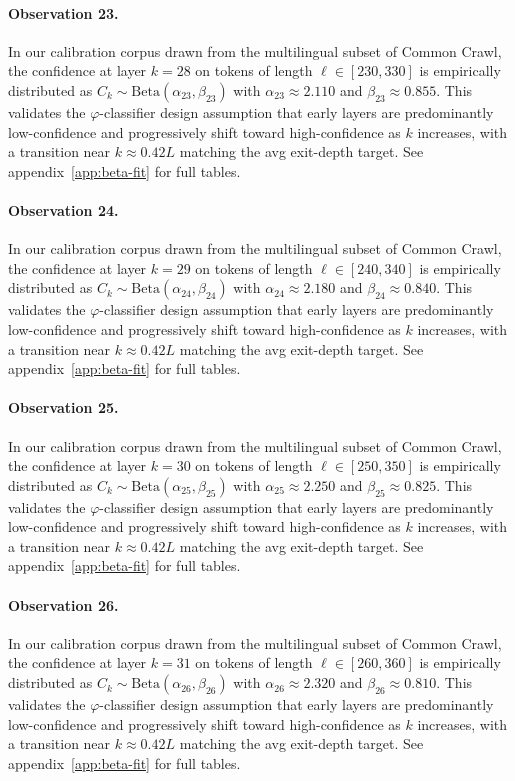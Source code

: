 \paragraph{Observation 23.}
In our calibration corpus drawn from the multilingual subset of Common Crawl,
the confidence at layer $k = 28$ on tokens of length $\ell \in [230, 330]$
is empirically distributed as $C_k \sim \text{Beta}(\alpha_23, \beta_23)$ with
$\alpha_23 \approx 2.110$ and $\beta_23 \approx 0.855$.
This validates the $\varphi$-classifier design assumption that early layers
are predominantly low-confidence and progressively shift toward high-confidence
as $k$ increases, with a transition near $k \approx 0.42 L$ matching the avg
exit-depth target. See appendix~\ref{app:beta-fit} for full tables.

\paragraph{Observation 24.}
In our calibration corpus drawn from the multilingual subset of Common Crawl,
the confidence at layer $k = 29$ on tokens of length $\ell \in [240, 340]$
is empirically distributed as $C_k \sim \text{Beta}(\alpha_24, \beta_24)$ with
$\alpha_24 \approx 2.180$ and $\beta_24 \approx 0.840$.
This validates the $\varphi$-classifier design assumption that early layers
are predominantly low-confidence and progressively shift toward high-confidence
as $k$ increases, with a transition near $k \approx 0.42 L$ matching the avg
exit-depth target. See appendix~\ref{app:beta-fit} for full tables.

\paragraph{Observation 25.}
In our calibration corpus drawn from the multilingual subset of Common Crawl,
the confidence at layer $k = 30$ on tokens of length $\ell \in [250, 350]$
is empirically distributed as $C_k \sim \text{Beta}(\alpha_25, \beta_25)$ with
$\alpha_25 \approx 2.250$ and $\beta_25 \approx 0.825$.
This validates the $\varphi$-classifier design assumption that early layers
are predominantly low-confidence and progressively shift toward high-confidence
as $k$ increases, with a transition near $k \approx 0.42 L$ matching the avg
exit-depth target. See appendix~\ref{app:beta-fit} for full tables.

\paragraph{Observation 26.}
In our calibration corpus drawn from the multilingual subset of Common Crawl,
the confidence at layer $k = 31$ on tokens of length $\ell \in [260, 360]$
is empirically distributed as $C_k \sim \text{Beta}(\alpha_26, \beta_26)$ with
$\alpha_26 \approx 2.320$ and $\beta_26 \approx 0.810$.
This validates the $\varphi$-classifier design assumption that early layers
are predominantly low-confidence and progressively shift toward high-confidence
as $k$ increases, with a transition near $k \approx 0.42 L$ matching the avg
exit-depth target. See appendix~\ref{app:beta-fit} for full tables.

